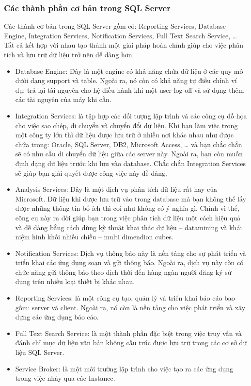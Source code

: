 \subsubsection{Các thành phần cơ bản trong SQL Server}
Các thành cơ bản trong SQL Server gồm có: Reporting Services, Database Engine, Integration Services, Notification Services, Full Text Search Service, … Tất cả kết hợp với nhau tạo thành một giải pháp hoàn chỉnh giúp cho việc phân tích và lưu trữ dữ liệu trở nên dễ dàng hơn.
\begin{itemize}
\item	Database Engine: Đây là một engine có khả năng chứa dữ liệu ở các quy mô dưới dạng support và table. Ngoài ra, nó còn có khả năng tự điều chỉnh ví dụ: trả lại tài nguyên cho hệ điều hành khi một user log off và sử dụng thêm các tài nguyên của máy khi cần.
\item	Integration Services: là tập hợp các đối tượng lập trình và các công cụ đồ họa cho việc sao chép, di chuyển và chuyển đổi dữ liệu.  Khi bạn làm việc trong một công ty lớn thì dữ liệu được lưu trữ ở nhiều nơi khác nhau như được chứa trong: Oracle, SQL Server, DB2, Microsoft Access, … và bạn chắc chắn sẽ có nhu cầu di chuyển dữ liệu giữa các server này. Ngoài ra, bạn còn muốn định dạng dữ liệu trước khi lưu vào database. Chắc chắn Integration Services sẽ giúp bạn giải quyết được công việc này dễ dàng.
\item	Analysis Services: Đây là một dịch vụ phân tích dữ liệu rất hay của Microsoft. Dữ liệu khi được lưu trữ vào trong database mà bạn không thể lấy được những thông tin bổ ích thì coi như không có ý nghĩa gì. Chính vì thế, công cụ này ra đời giúp bạn trong việc phân tích dữ liệu một cách hiệu quả và dễ dàng bằng cách dùng kỹ thuật khai thác dữ liệu – datamining và khái niệm hình khối nhiều chiều – multi dimendion cubes.
\item	Notification Services: Dịch vụ thông báo này là nền tảng cho sự phát triển và triển khai các ứng dụng soạn và gửi thông báo. Ngoài ra, dịch vụ này còn có chức năng gửi thông báo theo dịch thời đến hàng ngàn người đăng ký sử dụng trên nhiều loại thiết bị khác nhau.
\item	Reporting  Services: là một công cụ tạo, quản lý và triển khai báo cáo bao gồm: server và client. Ngoài ra, nó còn là nền tảng cho việc phát triển và xây dựng các ứng dụng báo cáo.
\item	Full Text Search Service: là một thành phần đặc biệt trong việc truy vấn và đánh chỉ mục dữ liệu văn bản không cấu trúc được lưu trữ trong các cơ sở dữ liệu SQL Server.
\item	Service Broker: là một môi trường lập trình cho việc tạo ra các ứng dụng trong việc nhảy qua các Instance.
\end{itemize}
